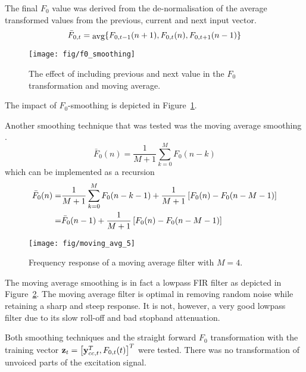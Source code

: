 The final $F_0$ value was derived from the de-normalisation of the average transformed values from the previous, current and next input vector.
\begin{equation}
	\bar{F}_{0,t} = \txt{avg}\cbrackets{F_{0,t-1}(n+1),F_{0,t}(n),F_{0,t+1}(n-1)} 
\end{equation}
\begin{figure}[htbp]
	\begin{center}
		\texttt{[image: fig/f0\_smoothing]}
		\caption{The effect of including previous and next value in the $F_0$ transformation and moving average.}
		\label{fig:f0_smoothing}
	\end{center}
\end{figure}
The impact of $F_0$-smoothing is depicted in Figure~\ref{fig:f0_smoothing}.

Another smoothing technique that was tested was the moving average smoothing \cite{digsig}.
\begin{equation}
		\bar{F}_0(n) = \frac{1}{M+1}\sum_{k=0}^{M}F_0(n-k)
\end{equation}
which can be implemented as a recursion
\begin{equation}
	\begin{split}
		\bar{F}_0(n) = & \frac{1}{M+1} \sum_{k=0}^{M}F_0(n-k-1) + \frac{1}{M+1} \left[F_0(n)-F_0(n-M-1)\right] \\
		= & \bar{F}_0(n-1) + \frac{1}{M+1} \left[F_0(n)-F_0(n-M-1)\right] \\
	\end{split}
\end{equation}
\begin{figure}[htbp]
	\begin{center}
		\texttt{[image: fig/moving\_avg\_5]}
		\caption{Frequency response of a moving average filter with $M=4$.}
		\label{fig:moving_avg}
	\end{center}
\end{figure}
The moving average smoothing is in fact a lowpass FIR filter as depicted in Figure~\ref{fig:moving_avg}. The moving average filter is optimal in removing random noise while retaining a sharp and steep response. It is not, however, a very good lowpass filter due to its slow roll-off and bad stopband attenuation.

Both smoothing techniques and the straight forward $F_0$ transformation with the training vector $\mathbf{z}_t = \left[\mathbf{y}_{cc,t}^T,F_{0,t}(t)\right]^T$ were tested. There was no transformation of unvoiced parts of the excitation signal.

